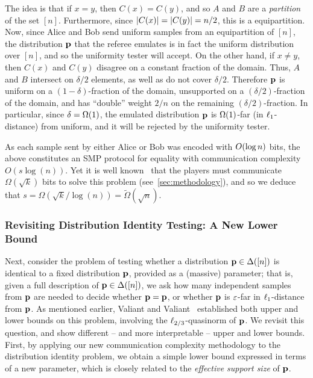 The idea is that if $x=y$, then $C(x)=C(y)$, and so $A$ and $B$ are a \emph{partition} of the set $[n]$. Furthermore, since $\abs{C(x)} = \abs{C(y)} = n/2$, this is a equipartition. Now, since Alice and Bob send uniform samples from an equipartition of $[n]$, the distribution $\q$ that the referee emulates is in fact the uniform distribution over $[n]$, and so the uniformity tester will accept. On the other hand, if $x\neq y$, then $C(x)$ and $C(y)$ disagree on a constant fraction of the domain. Thus, $A$ and $B$ intersect on $\delta/2$ elements, as well as do not cover $\delta/2$. Therefore $\q$ is uniform on a $(1-\delta)$-fraction of the domain, unsupported on a $(\delta/2)$-fraction of the domain, and has ``double'' weight $2/n$ on the remaining $(\delta/2)$-fraction. In particular, since $\delta = \bigOmega{1}$, the emulated distribution $\q$ is $\bigOmega{1}$-far (in $\lp[1]$-distance) from uniform, and it will be rejected by the uniformity tester.

As each sample sent by either Alice or Bob was encoded with $\bigO{\log n}$ bits, the above constitutes an SMP protocol for equality with communication complexity $O(s \log(n))$.  Yet it is well known~\cite{newman1996public} that the players must communicate $\Omega(\sqrt{k})$ bits to solve this problem (see~\cref{sec:methodology}), and so we deduce that $s = \Omega(\sqrt{k}/\log(n)) = \tilde\Omega(\sqrt{n})$.

\subsubsection{Revisiting Distribution Identity Testing: A New Lower Bound}
\label{sec:overview:lb}
Next, consider the problem of testing whether a distribution $\q\in\distribs{[n]}$ is identical to a fixed distribution $\p$, provided as a (massive) parameter; that is, given a full description of $\p\in\distribs{[n]}$, we ask how many independent samples from $\q$ are needed to decide whether $\q=\p$, or whether $\q$ is $\eps$-far in $\lp[1]$-distance from $\p$. As mentioned earlier, Valiant and Valiant~\cite{VV:14} established both upper and lower bounds on this problem, involving the $\lp[2/3]$-quasinorm of $\p$. We revisit this question, and show different -- and more interpretable -- upper and lower bounds. First, by applying our new communication complexity methodology to the distribution identity problem, we obtain a simple lower bound expressed in terms of a new parameter, which is closely related to the \emph{effective support size} of $\p$.

